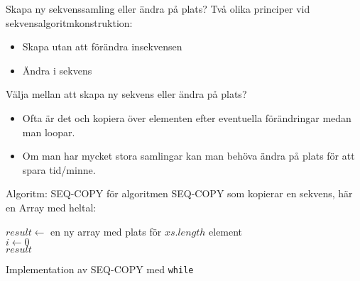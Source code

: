 

\begin{Slide}{Skapa ny sekvenssamling eller ändra på plats?}
Två olika principer vid sekvensalgoritmkonstruktion:
\begin{itemize}
\item Skapa  utan att förändra insekvensen
\item Ändra   i  sekvens
\end{itemize}
\pause
\vspace{1em}
Välja mellan att skapa ny sekvens eller ändra på plats?
\begin{itemize}
\item Ofta är det  och kopiera över elementen efter eventuella förändringar medan man loopar.
\item Om man har mycket stora samlingar kan man behöva ändra på plats för att spara tid/minne.
\end{itemize}
\end{Slide}

\begin{Slide}{Algoritm: SEQ-COPY}
 för algoritmen SEQ-COPY som kopierar en sekvens, här en Array med heltal:\\
\noindent\hrulefill
\begin{algorithm}[H]
 $result \leftarrow$ en ny array med plats för $xs.length$ element\\
 $i \leftarrow 0$  \\
 \Return $result$
\end{algorithm}
\noindent\hrulefill
\end{Slide}

\begin{Slide}{Implementation av SEQ-COPY med \texttt{while}}

\end{Slide}

% 
%
% 
